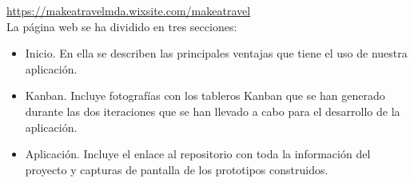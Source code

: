 \documentclass[11pt]{article}
\begin{document}
\url{https://makeatravelmda.wixsite.com/makeatravel} \\

La página web se ha dividido en tres secciones:
\begin{itemize}
\item Inicio. En ella se describen las principales ventajas que tiene el uso de nuestra aplicación.
\item Kanban. Incluye fotografías con los tableros Kanban que se han generado durante las dos iteraciones que se han llevado a cabo para el desarrollo de la aplicación.
\item Aplicación. Incluye el enlace al repositorio con toda la información del proyecto y capturas de pantalla de los prototipos construidos.
\end{itemize} 
\end{document}

